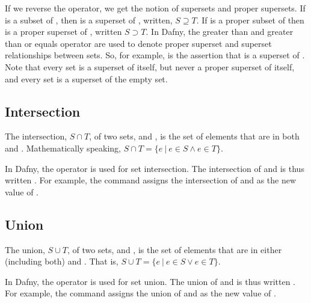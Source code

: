\documentclass[letterpaper,10pt,english]{sphinxmanual}
\begin{document}
If we reverse the operator, we get the notion of supersets and proper
supersets. If  is a subset of , then  is a superset of ,
written, \(S \supseteq T\). If  is a proper subset of  then
 is a proper superset of , written \(S \supset T\). In
Dafny, the greater than and greater than or equals operator are used
to denote proper superset and superset relationships between sets.
So, for example,  is the assertion that  is a superset of
. Note that every set is a superset of itself, but never a proper
superset of itself, and every set is a superset of the empty set.


\subsection{Intersection}
\label{\detokenize{07-set-theory:intersection}}
The intersection, \(S \cap T\), of two sets,  and , is the
set of elements that are in both  and . Mathematically speaking,
\(S \cap T = \{ e~|~e \in S \land e \in T \}\).

In Dafny, the \sphinxstyleemphasis{*} operator is used for set intersection.  The
intersection of  and  is thus written . For example, the
command  assigns the intersection of  and  as the
new value of .


\subsection{Union}
\label{\detokenize{07-set-theory:union}}
The union, \(S \cup T\), of two sets,  and , is the set of
elements that are in either (including both)  and . That is,
\(S \cup T = \{ e~|~e \in S \lor e \in T \}\).

In Dafny, the \sphinxstyleemphasis{+} operator is used for set union.  The union of 
and  is thus written . For example, the command  assigns the union of  and  as the new value of .
\end{document}
